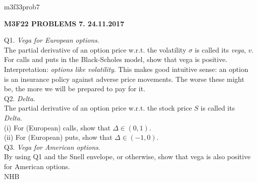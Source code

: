 \documentclass[12pt]{article}
\begin{document}
\def\R{\mathbb{R}}
\def\C{\mathbb{C}}
\def\Z{\mathbb{Z}}
\def\N{\mathbb{N}}
\def\Q{\mathbb{Q}}
\def\D{\mathbb{D}}
\def\Sp{{\mathbb{S}}}
\def\T{\mathbb{T}}
\def\H{\mathbb{H}}
\def\hb{\hfil \break}
\def\ni{\noindent}
\def\i{\indent}
\def\a{\alpha}
\def\b{\beta}
\def\e{\epsilon}
\def\d{\delta}
\def\D{\Delta}
\def\G{\Gamma}
\def\g{\gamma}
\def\l{\lambda}
\def\m{\mu}
\def\s{\sigma}
\def\Si{\Sigma}
\def\th{\theta}
\def\z{\zeta}
\def\p{\partial}
\def\o{\omega}
\def\O{\Omega}
\def\t{\tau}
\def\L{\it \char'44}
\def\F{\mathcal{F}}
\def\B{\mathcal{B}}
\def\C{\mathcal{C}}
\def\half{\frac{1}{2}}
\ni m3f33prob7 \\
\begin{center}
{\bf M3F22 PROBLEMS 7.  24.11.2017} 
\end{center}
\ni Q1. {\it Vega for European options}.  \\
\i The partial derivative of an option price w.r.t. the volatility $\s$ is called its {\it vega}, $v$. \\
\i For calls and puts in the Black-Scholes model, show that vega is positive.  Interpretation: {\it options like volatility}.  This makes good intuitive sense: an option is an insurance policy against adverse price movements.  The worse these might be, the more we will be prepared to pay for it. \\

\ni Q2.  {\it Delta}.  \\
\i The partial derivative of an option price w.r.t. the stock price $S$ is called its {\it Delta}. \\
(i) For (European) calls, show that $\Delta \in (0,1)$. \\
(ii) For (European) puts, show that $\Delta \in (-1,0)$. \\

\ni Q3.  {\it Vega for American options}.  \\
\i By using Q1 and the Snell envelope, or otherwise, show that vega is also positive for American options. \\

\hfil NHB \break
\end{document}
